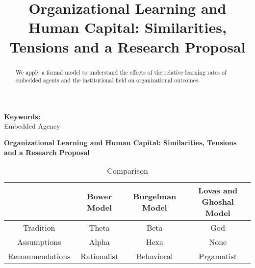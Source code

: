 \documentclass[12pt,letterpaper]{article}
\begin{document}
\title{Organizational Learning and Human Capital: Similarities, Tensions and a Research Proposal}
\date{}
\maketitle

\begin{abstract} 
\normalsize 
We apply a formal model to understand the effects of the relative learning rates of embedded agents and the institutional field on organizational outcomes. 
\end{abstract}


{\textbf{Keywords:} \\\indent Embedded Agency}

\newpage
\pagestyle{fancy}
\fancyhf{}
\rhead{\thepage}

\begin{center}
\textbf{Organizational Learning and Human Capital: Similarities, Tensions and a Research Proposal}
\end{center}

\begin{table}
\begin{centering}
\caption {Comparison}
\label{qe2a}
{\tabulinesep=1.4mm
\begin{tabu}{|c|c|c|c|}
\hline
          & Bower Model & Burgelman Model & Lovas and Ghoshal Model \\
\hline   
    Tradition & Theta & Beta  & God \\
\hline    
    Assumptions & Alpha & Hexa  & None \\
\hline    
    Recommendations & Rationalist & Behavioral & Prgamatist \\
\hline 
\end{tabu}}

\end{centering}
\end{table} 
\end{document}
